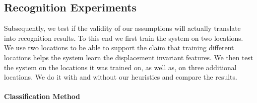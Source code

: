 \subsection{Recognition Experiments}
Subsequently, we test if the validity of our assumptions will actually translate
into recognition results.  To this end we first 
train the system on two locations. We use two locations to be able to
support the claim that training different locations helps the system
learn the displacement invariant features.
We then test the system on the locations it was trained on, as
well as, on three additional locations. We do it with and without our
heuristics and compare the results.

\paragraph{Classification Method}

